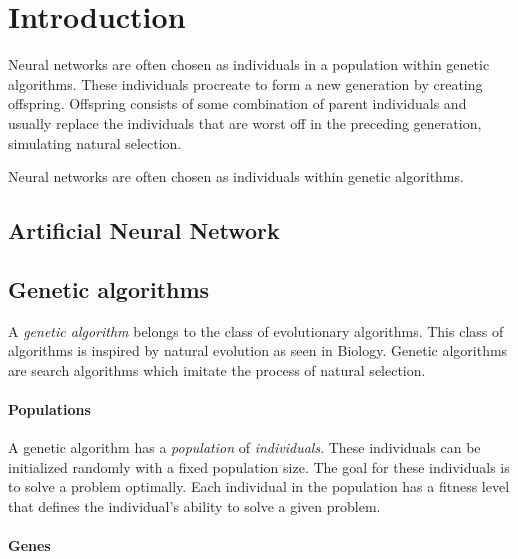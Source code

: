 \section{Introduction}
Neural networks are often chosen as individuals in a population within genetic algorithms. These individuals procreate to form a new generation by creating offspring. Offspring consists of some combination of parent individuals and usually replace the individuals that are worst off in the preceding generation, simulating natural selection.

Neural networks are often chosen as individuals within genetic algorithms.


\subsection{Artificial Neural Network}


\subsection{Genetic algorithms}

A \emph{genetic algorithm} belongs to the class of evolutionary algorithms. This class of algorithms is inspired by natural evolution as seen in Biology. Genetic algorithms are search algorithms which imitate the process of natural selection.

\paragraph{Populations}

A genetic algorithm has a \emph{population} of \emph{individuals}. These individuals can be initialized randomly with a fixed population size.
The goal for these individuals is to solve a problem optimally. Each individual in the population has a fitness level that defines the individual's ability to solve a given problem.

\paragraph{Genes}

